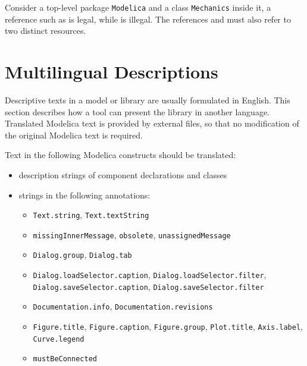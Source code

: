 \begin{example}
Consider a top-level package \lstinline!Modelica! and a class \lstinline!Mechanics! inside it, a reference such as  is legal, while  is illegal.
The references  and  must also refer to two distinct resources.
\end{example}


\section{Multilingual Descriptions}\label{multilingual-descriptions}

\begin{nonnormative}
Descriptive texts in a model or library are usually formulated in English.
This section describes how a tool can present the library in another language.
Translated Modelica text is provided by external files, so that no modification of the original Modelica text is required.
\end{nonnormative}

Text in the following Modelica constructs should be translated:
\begin{itemize}
\item description strings of component declarations and classes
\item strings in the following annotations:
\begin{itemize}
\item \lstinline!Text.string!, \lstinline!Text.textString!
\item \lstinline!missingInnerMessage!, \lstinline!obsolete!, \lstinline!unassignedMessage!
\item \lstinline!Dialog.group!, \lstinline!Dialog.tab!
\item
  \lstinline!Dialog.loadSelector.caption!, \lstinline!Dialog.loadSelector.filter!,
  \ifpdf\\\else\fi%
  \lstinline!Dialog.saveSelector.caption!, \lstinline!Dialog.saveSelector.filter!
\item \lstinline!Documentation.info!, \lstinline!Documentation.revisions!
\item \lstinline!Figure.title!, \lstinline!Figure.caption!, \lstinline!Figure.group!, \lstinline!Plot.title!, \lstinline!Axis.label!, \lstinline!Curve.legend!
\item \lstinline!mustBeConnected!
\end{itemize}
\end{itemize}


